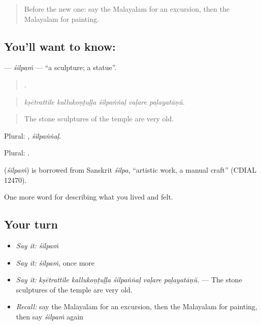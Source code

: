 \label{lesson:ML-C560-silpam}



\begin{quote}
Before the new one: say the Malayalam for an excursion, then the Malayalam for painting.
\end{quote}

\subsection*{You'll want to know: }
\textbf{} — \emph{śilpaṁ} — \textquotedblleft{}a sculpture; a statue\textquotedblright{}.

\begin{quote}
    .
\end{quote}

\begin{quote}
\emph{kṣētrattile kallukoṇṭuḷḷa śilpaṅṅaḷ vaḷare paḻayatāṇŭ.}
\end{quote}

\begin{quote}
The stone sculptures of the temple are very old.
\end{quote}

Plural: , \emph{śilpaṅṅaḷ}.

Plural: .

\begin{cousinweb}
\textbf{} (\emph{śilpaṁ}) is borrowed from Sanskrit \emph{śilpa}, \textquotedblleft{}artistic work, a manual craft\textquotedblright{} (CDIAL 12470).
\end{cousinweb}

\begin{grammarlens}[title={What you've built}]
One more word for describing what you lived and felt.
\end{grammarlens}

\subsection*{Your turn}
\begin{itemize}
\raggedright
  \item \emph{Say it:} \emph{śilpaṁ}
  \item \emph{Say it:} \emph{śilpaṁ}, once more
  \item \emph{Say it:} \emph{kṣētrattile kallukoṇṭuḷḷa śilpaṅṅaḷ vaḷare paḻayatāṇŭ.} — The stone sculptures of the temple are very old.
  \item \emph{Recall:} say the Malayalam for an excursion, then the Malayalam for painting, then say \emph{śilpaṁ} again
\end{itemize}

